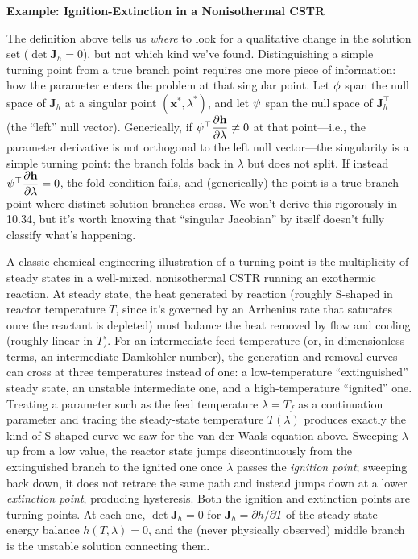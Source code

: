 \begin{exampleBox}
\textbf{Example: Ignition-Extinction in a Nonisothermal CSTR}

The definition above tells us \emph{where} to look for a qualitative change in the solution set ($\det \mathbf{J}_h=0$), but not which kind we've found. Distinguishing a simple turning point from a true branch point requires one more piece of information: how the parameter enters the problem at that singular point. Let $\mathbf{\phi}$ span the null space of $\mathbf J_h$ at a singular point $(\mathbf x^*,\lambda^*)$, and let $\mathbf{\psi}$ span the null space of $\mathbf J_h^\top$ (the ``left'' null vector). Generically, if $\mathbf{\psi}^\top \dfrac{\partial \mathbf h}{\partial\lambda} \neq 0$ at that point---i.e., the parameter derivative is not orthogonal to the left null vector---the singularity is a simple turning point: the branch folds back in $\lambda$ but does not split. If instead $\mathbf{\psi}^\top \dfrac{\partial \mathbf h}{\partial \lambda} = 0$, the fold condition fails, and (generically) the point is a true branch point where distinct solution branches cross. We won't derive this rigorously in 10.34, but it's worth knowing that ``singular Jacobian'' by itself doesn't fully classify what's happening.

A classic chemical engineering illustration of a turning point is the multiplicity of steady states in a well-mixed, nonisothermal CSTR running an exothermic reaction. At steady state, the heat generated by reaction (roughly S-shaped in reactor temperature $T$, since it's governed by an Arrhenius rate that saturates once the reactant is depleted) must balance the heat removed by flow and cooling (roughly linear in $T$). For an intermediate feed temperature (or, in dimensionless terms, an intermediate Damk\"ohler number), the generation and removal curves can cross at three temperatures instead of one: a low-temperature ``extinguished'' steady state, an unstable intermediate one, and a high-temperature ``ignited'' one. Treating a parameter such as the feed temperature $\lambda = T_f$ as a continuation parameter and tracing the steady-state temperature $T(\lambda)$ produces exactly the kind of S-shaped curve we saw for the van der Waals equation above. Sweeping $\lambda$ up from a low value, the reactor state jumps discontinuously from the extinguished branch to the ignited one once $\lambda$ passes the \emph{ignition point}; sweeping back down, it does not retrace the same path and instead jumps down at a lower \emph{extinction point}, producing hysteresis. Both the ignition and extinction points are turning points. At each one, $\det \mathbf J_h = 0$ for $\mathbf J_h = \partial h/\partial T$ of the steady-state energy balance $h(T,\lambda)=0$, and the (never physically observed) middle branch is the unstable solution connecting them.
\end{exampleBox}

